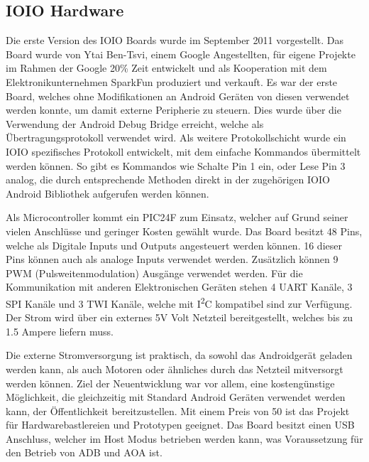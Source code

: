 \documentclass[12pt,journal,compsoc]{IEEEtran}
\begin{document}
\subsection{IOIO Hardware}
Die erste Version des IOIO Boards wurde im September 2011 vorgestellt. Das Board wurde von Ytai Ben-Tsvi, einem Google Angestellten, für eigene Projekte im Rahmen der Google 20\% Zeit entwickelt und als Kooperation mit dem Elektronikunternehmen SparkFun produziert und verkauft.
Es war der erste Board, welches ohne Modifikationen an Android Geräten von diesen verwendet werden konnte, um damit externe Peripherie zu steuern.
Dies wurde über die Verwendung der Android Debug Bridge erreicht, welche als Übertragungsprotokoll verwendet wird.
Als weitere Protokollschicht wurde ein IOIO spezifisches Protokoll entwickelt, mit dem einfache Kommandos übermittelt werden können.
So gibt es Kommandos wie \glqq Schalte Pin 1 ein\grqq, oder \glqq Lese Pin 3 analog\grqq, die durch entsprechende Methoden direkt in der zugehörigen IOIO Android Bibliothek aufgerufen werden können.

Als Microcontroller kommt ein PIC24F zum Einsatz, welcher auf Grund seiner vielen Anschlüsse und geringer Kosten gewählt wurde.
Das Board besitzt 48 Pins, welche als Digitale Inputs und Outputs angesteuert werden können. 16 dieser Pins können auch als analoge Inputs verwendet werden.
Zusätzlich können 9 PWM (Pulsweitenmodulation) Ausgänge verwendet werden.
Für die Kommunikation mit anderen Elektronischen Geräten stehen 4 UART Kanäle, 3 SPI Kanäle und 3 TWI Kanäle, welche mit I\textsuperscript{2}C kompatibel sind zur Verfügung.
Der Strom wird über ein externes 5V Volt Netzteil bereitgestellt, welches bis zu 1.5 Ampere liefern muss.

Die externe Stromversorgung ist praktisch, da sowohl das Androidgerät geladen werden kann, als auch Motoren oder ähnliches durch das Netzteil mitversorgt werden können.
Ziel der Neuentwicklung war vor allem, eine kostengünstige Möglichkeit, die gleichzeitig mit Standard Android Geräten verwendet werden kann, der Öffentlichkeit bereitzustellen.
Mit einem Preis von 50\textdollar{} ist das Projekt für Hardwarebastlereien und Prototypen geeignet.
Das Board besitzt einen USB Anschluss, welcher im Host Modus betrieben werden kann, was Voraussetzung für den Betrieb von ADB und AOA ist.
\end{document}
